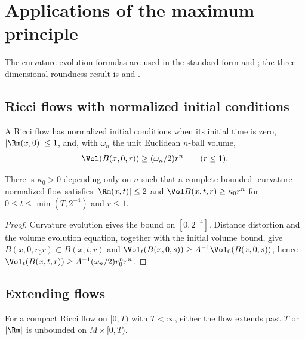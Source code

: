 \section{Applications of the maximum principle}
The curvature evolution formulas are used in the standard form
\cite{ChowLuNi} and \cite{ChowLuNi}; the three-dimensional roundness result is
\cite{Hamilton3MPRC} and \cite{Hamilton3MPRC}.
\subsection{Ricci flows with normalized initial conditions}

\begin{definition}
\label{def:normalized-initial-conditions}
\label{norminitcond}
A Ricci flow has normalized initial conditions when its initial time is zero,
$|\Rm(x,0)|\le1$, and, with $\omega_n$ the unit Euclidean $n$-ball volume,
\[
\Vol(B(x,0,r))\ge(\omega_n/2)r^n\qquad (r\le1).
\]
\end{definition}

\begin{proposition}
\label{prop:normalized-flow-short-time-bounds}
\label{kappa0r0t0}
There is $\kappa_0>0$ depending only on $n$ such that a complete bounded-
curvature normalized flow satisfies $|\Rm(x,t)|\le2$ and
$\Vol B(x,t,r)\ge\kappa_0r^n$ for $0\le t\le\min(T,2^{-4})$ and $r\le1$.
\end{proposition}
\begin{proof}
\sketch Curvature evolution gives the bound on $[0,2^{-4}]$. Distance
distortion and the volume evolution equation, together with the initial
volume bound, give $B(x,0,r_0r)\subset B(x,t,r)$ and
$\Vol_t(B(x,0,s))\ge A^{-1}\Vol_0(B(x,0,s))$, hence
$\Vol_t(B(x,t,r))\ge A^{-1}(\omega_n/2)r_0^nr^n$.
\end{proof}

\subsection{Extending flows}
\begin{proposition}
\label{prop:ricci-flow-extension-criterion}
\label{flowextend}
For a compact Ricci flow on $[0,T)$ with $T<\infty$, either the flow extends
past $T$ or $|\Rm|$ is unbounded on $M\times[0,T)$.
\end{proposition}

